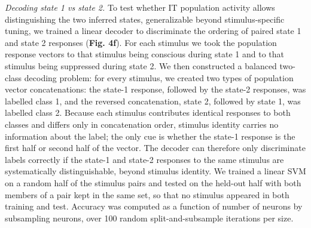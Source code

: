 \documentclass{article}
\begin{document}
\textit{Decoding state 1 vs state 2.} To test whether IT population activity allows distinguishing the two inferred states, generalizable beyond stimulus-specific tuning, we trained a linear decoder to discriminate the ordering of paired state 1 and state 2 responses (\textbf{Fig. 4f}). For each stimulus we took the population response vectors to that stimulus being conscious during state 1 and to that stimulus being suppressed during state 2. We then constructed a balanced two-class decoding problem: for every stimulus, we created two types of population vector concatenations: the state-1 response, followed by the state-2 responses, was labelled class 1, and the reversed concatenation, state 2, followed by state 1, was labelled class 2. Because each stimulus contributes identical responses to both classes and differs only in concatenation order, stimulus identity carries no information about the label; the only cue is whether the state-1 response is the first half or second half of the vector. The decoder can therefore only discriminate labels correctly if the state-1 and state-2 responses to the same stimulus are systematically distinguishable, beyond stimulus identity. We trained a linear SVM on a random half of the stimulus pairs and tested on the held-out half with both members of a pair kept in the same set, so that no stimulus appeared in both training and test. Accuracy was computed as a function of number of neurons by subsampling neurons, over 100 random split-and-subsample iterations per size.
\end{document}
